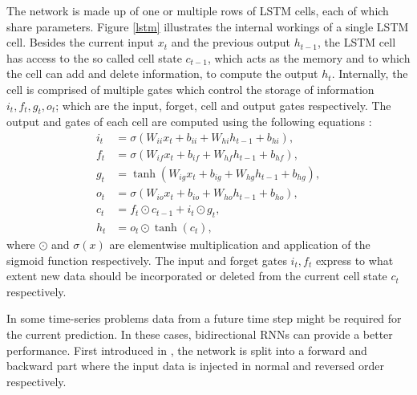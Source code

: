 The network is made up of one or multiple rows of LSTM cells, each of which share parameters.
Figure \ref{lstm} illustrates the internal workings of a single LSTM cell.
Besides the current input $x_t$ and the previous output $h_{t-1}$, the LSTM cell has access to the so called cell state $c_{t-1}$, which acts as the memory and to which the cell can add and delete information, to compute the output $h_t$.
Internally, the cell is comprised of multiple gates which control the storage of information $i_t, f_t, g_t, o_t$; which are the input, forget, cell and output gates respectively.
The output and gates of each cell are computed using the following equations \cite{NEURIPS2019_9015}:
\begin{align*}
i_t & = \sigma (W_{ii} x_t + b_{ii} + W_{hi} h_{t-1} + b_{hi}), \\
f_t & = \sigma (W_{if} x_t + b_{if} + W_{hf} h_{t-1} + b_{hf}), \\
g_t & = \tanh (W_{ig} x_t + b_{ig} + W_{hg} h_{t-1} + b_{hg}), \\ 
o_t & = \sigma (W_{io} x_t + b_{io} + W_{ho} h_{t-1} + b_{ho}), \\
c_t & = f_t \odot c_{t-1} + i_t \odot g_t, \\
h_t & = o_t \odot \tanh (c_t),
\end{align*}
where $\odot$ and $\sigma(x)$ are elementwise multiplication and application of the sigmoid function respectively.
The input and forget gates $i_t, f_t$ express to what extent new data should be incorporated or deleted from the current cell state $c_t$ respectively.

In some time-series problems data from a future time step might be required for the current prediction.
In these cases, bidirectional RNNs can provide a better performance.
First introduced in \cite{bidirrnn}, the network is split into a forward and backward part where the input data is injected in normal and reversed order respectively.

